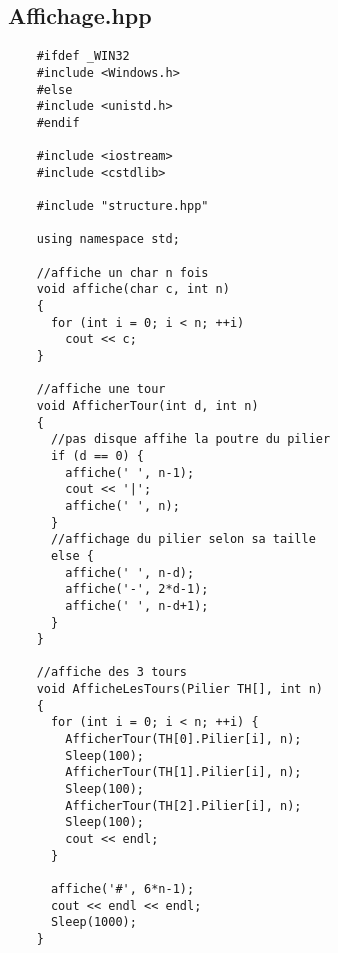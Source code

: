 \subsection{Affichage.hpp}
\begin{verbatim}
    #ifdef _WIN32
    #include <Windows.h>
    #else
    #include <unistd.h>
    #endif
    
    #include <iostream>
    #include <cstdlib>
    
    #include "structure.hpp"
    
    using namespace std;
    
    //affiche un char n fois
    void affiche(char c, int n)
    {
      for (int i = 0; i < n; ++i)
        cout << c;
    }
    
    //affiche une tour
    void AfficherTour(int d, int n)
    {
      //pas disque affihe la poutre du pilier
      if (d == 0) {
        affiche(' ', n-1);
        cout << '|';
        affiche(' ', n);
      }
      //affichage du pilier selon sa taille
      else {
        affiche(' ', n-d);
        affiche('-', 2*d-1);
        affiche(' ', n-d+1);
      }
    }
    
    //affiche des 3 tours
    void AfficheLesTours(Pilier TH[], int n)
    {
      for (int i = 0; i < n; ++i) {
        AfficherTour(TH[0].Pilier[i], n);
        Sleep(100);
        AfficherTour(TH[1].Pilier[i], n);
        Sleep(100);
        AfficherTour(TH[2].Pilier[i], n);
        Sleep(100);
        cout << endl;
      }
    
      affiche('#', 6*n-1);
      cout << endl << endl;
      Sleep(1000);
    }
\end{verbatim}


